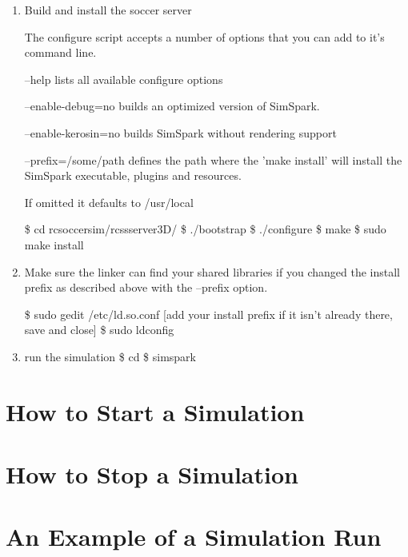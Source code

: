 \begin{enumerate}
\item Build and install the soccer server

The configure script accepts a number of options that you can add to
it's command line.


--help lists all available configure options

--enable-debug=no builds an optimized version of SimSpark.

--enable-kerosin=no builds SimSpark without rendering support

--prefix=/some/path defines the path where the 'make install' will install the SimSpark executable, plugins and resources.

If omitted it defaults to /usr/local

\$ cd rcsoccersim/rcssserver3D/
\$ ./bootstrap
\$ ./configure
\$ make
\$ sudo make install

\item Make sure the linker can find your shared libraries if you changed
the install prefix as described above with the --prefix option.

\$ sudo gedit /etc/ld.so.conf
[add your install prefix if it isn't already there, save and close]
\$ sudo ldconfig

\item run the simulation
\$ cd
\$ simspark

\end{enumerate}

\section{How to Start a Simulation}

\section{How to Stop a Simulation}

\section{An Example of a Simulation Run}



